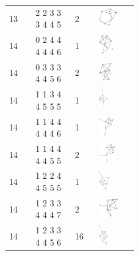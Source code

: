 \begin{footnotesize}
\begin{longtable}{m{0.07\linewidth} m{0.15\linewidth} m{0.05\linewidth} m{0.15\linewidth}}
13 & 2 2 3 3 3 4 4 5 & 2 & \includegraphics[height=0.8cm]{15-universal-graphs/img/degree-sequences-example-graphs/graph-4-8-61}\\
14 & 0 2 4 4 4 4 4 6 & 1 & \includegraphics[height=0.8cm]{15-universal-graphs/img/degree-sequences-example-graphs/graph-4-8-62}\\
14 & 0 3 3 3 4 4 5 6 & 2 & \includegraphics[height=0.8cm]{15-universal-graphs/img/degree-sequences-example-graphs/graph-4-8-63}\\
14 & 1 1 3 4 4 5 5 5 & 1 & \includegraphics[height=0.8cm]{15-universal-graphs/img/degree-sequences-example-graphs/graph-4-8-64}\\
14 & 1 1 4 4 4 4 4 6 & 1 & \includegraphics[height=0.8cm]{15-universal-graphs/img/degree-sequences-example-graphs/graph-4-8-65}\\
14 & 1 1 4 4 4 4 5 5 & 2 & \includegraphics[height=0.8cm]{15-universal-graphs/img/degree-sequences-example-graphs/graph-4-8-66}\\
14 & 1 2 2 4 4 5 5 5 & 1 & \includegraphics[height=0.8cm]{15-universal-graphs/img/degree-sequences-example-graphs/graph-4-8-67}\\
14 & 1 2 3 3 4 4 4 7 & 2 & \includegraphics[height=0.8cm]{15-universal-graphs/img/degree-sequences-example-graphs/graph-4-8-68}\\
14 & 1 2 3 3 4 4 5 6 & 16 & \includegraphics[height=0.8cm]{15-universal-graphs/img/degree-sequences-example-graphs/graph-4-8-69}\\

\end{longtable}
\end{footnotesize}
